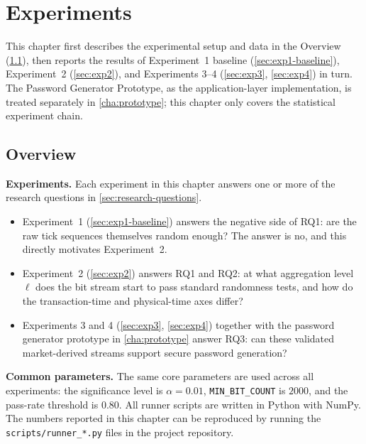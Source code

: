 \documentclass[11pt,titlepage,openany,oneside]{book}  %
\begin{document}
\chapter{Experiments}
\label{cha:experiments}

This chapter first describes the experimental setup and data in the Overview (\cref{sec:overview}), then reports the results of Experiment~1 baseline (\cref{sec:exp1-baseline}), Experiment~2 (\cref{sec:exp2}), and Experiments 3--4 (\cref{sec:exp3}, \cref{sec:exp4}) in turn. The Password Generator Prototype, as the application-layer implementation, is treated separately in \cref{cha:prototype}; this chapter only covers the statistical experiment chain.

\section{Overview}
\label{sec:overview}

\textbf{Experiments.} Each experiment in this chapter answers one or more of the research questions in \cref{sec:research-questions}.
\begin{itemize}
\item Experiment~1 (\cref{sec:exp1-baseline}) answers the negative side of RQ1: are the raw tick sequences themselves random enough? The answer is no, and this directly motivates Experiment~2.
\item Experiment~2 (\cref{sec:exp2}) answers RQ1 and RQ2: at what aggregation level $\ell$ does the bit stream start to pass standard randomness tests, and how do the transaction-time and physical-time axes differ?
\item Experiments 3 and 4 (\cref{sec:exp3}, \cref{sec:exp4}) together with the password generator prototype in \cref{cha:prototype} answer RQ3: can these validated market-derived streams support secure password generation?
\end{itemize}

\textbf{Common parameters.} The same core parameters are used across all experiments: the significance level is $\alpha = 0.01$, \texttt{MIN\_BIT\_COUNT} is $2000$, and the pass-rate threshold is $0.80$. All runner scripts are written in Python with NumPy. The numbers reported in this chapter can be reproduced by running the \texttt{scripts/runner\_*.py} files in the project repository.
\end{document}
